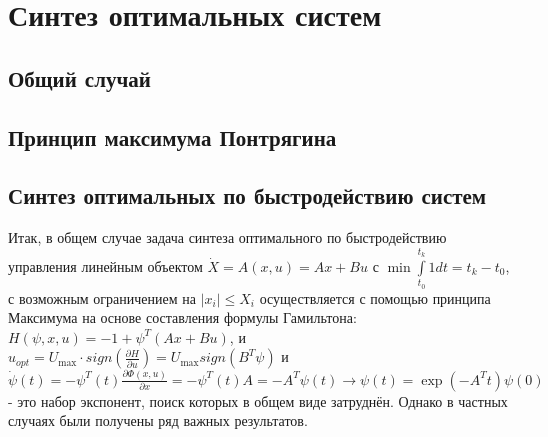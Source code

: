 \documentclass[preprint,russian,a5paper,10pt,twoside,mediummath]{ncc}
\begin{document}
  \section{Синтез оптимальных систем\label{synthesis}}
 \subsection{Общий случай\label{synthesis:general}}
 
 \subsection{Принцип максимума Понтрягина\label{synthesis:principle_of_maximum}}
 
 \subsection{Синтез оптимальных по быстродействию систем\label{synthesis:fastest}}
 Итак, в общем случае задача синтеза оптимального по быстродействию управления линейным объектом $\dot{X}=A\left( x,u \right)=Ax+Bu$ с $\min \int\limits_{{{t}_{0}}}^{{{t}_{k}}}{1dt={{t}_{k}}-{{t}_{0}}}$, с возможным ограничением на $\left| {{x}_{i}} \right|\le {{X}_{i}}$ осуществляется с помощью принципа Максимума на основе составления формулы Гамильтона: $H\left( \psi ,x,u \right)=-1+{{\psi }^{T}}\left( Ax+Bu \right)$, и ${{u}_{opt}}={{U}_{\max }}\cdot sign\left( \frac{\partial H}{\partial u} \right)={{U}_{\max }}sign\left( {{B}^{T}}\psi  \right)$ и  $\dot{\psi }\left( t \right)=-{{\psi }^{T}}\left( t \right)\frac{\partial \Phi \left( x,u \right)}{\partial x}=-{{\psi }^{T}}\left( t \right)A=-{{A}^{T}}\psi \left( t \right)\to \psi \left( t \right)=\exp \left( -{{A}^{T}}t \right)\psi \left( 0 \right)$ - это набор экспонент, поиск которых в общем виде затруднён. Однако в частных случаях были получены ряд важных результатов.
\end{document}
